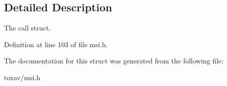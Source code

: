 \subsection{Detailed Description}
The call struct. 

Definition at line 103 of file msi.\+h.



The documentation for this struct was generated from the following file\+:\begin{DoxyCompactItemize}
\item 
toxav/msi.\+h\end{DoxyCompactItemize}
